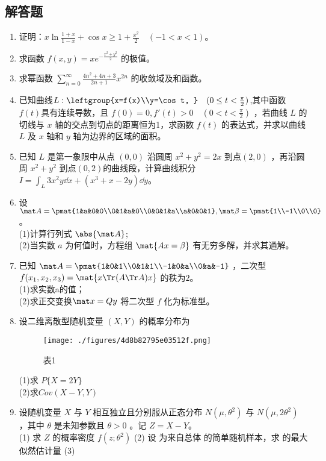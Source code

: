 \subsection{解答题}
\begin{enumerate}
\item 证明：$\displaystyle x\ln \frac{1+x}{1-x}+\cos x\ge 1+\frac{x^2}{2} \quad (-1<x<1)$。
\item  求函数 $\displaystyle f(x,y)=xe^{-\frac{x^2+y^2}{2}}$  的极值。
\item  求幂函数 $\displaystyle \sum_{n=0}^\infty \frac{4n^2+4n+3}{2n+1}x^{2n}$ 的收敛域及和函数。
\item 已知曲线$L:\leftgroup{x=f(x)\\y=\cos t, }\quad (0 \le t<\frac{\pi}{2} )$,其中函数 $f(t)$具有连续导数，且 $f(0)=0,f'(t)>0 \quad (0<t<\frac{\pi}{2})$  ，若曲线 $L$ 的切线与 $x$ 轴的交点到切点的距离恒为1，求函数 $f(t)$ 的表达式，并求以曲线 $L$  及 $x$ 轴和 $y$ 轴为边界的区域的面积。
\item  已知 $L$ 是第一象限中从点 $(0,0)$ 沿圆周 $x^2+y^2=2x$ 到点$ (2,0)$ ，再沿圆周 $x^2+y^2$ 到点$ (0,2)$的曲线段，计算曲线积分  $\displaystyle I=\int_L 3x^2y\dd{x+(x^3+x-2y)}\dd{y}$。
\item 设 $\mat A=\pmat{1&a&0&0\\0&1&a&0\\0&0&1&a\\a&0&0&1},\mat \beta =\pmat{1\\-1\\0\\0}$。\\
(1)计算行列式 $\abs{\mat A }$;\\
(2)当实数 $a$ 为何值时，方程组 $\mat{ Ax=\beta}$ 有无穷多解，并求其通解。
\item  已知 $\mat A=\pmat{1&0&1\\0&1&1\\-1&0&a\\0&a&-1}$  ，二次型  $f(x_1,x_2,x_3)=\mat{x \Tr(A \Tr A)x}$ 的秩为$2$。\\
(1)求实数a的值；\\
(2)求正交变换$\mat x=Qy$ 将二次型 $f$ 化为标准型。
\item 设二维离散型随机变量 $(X,Y)$ 的概率分布为
\begin{figure}[ht]
\centering
\texttt{[image: ./figures/4d8b82795e03512f.png]}
\caption{表1} \label{fig_PeeM12_1}
\end{figure}
(1)求 $P\{X=2Y\}$\\
(2)求$Cov (X-Y,Y)$
\item 设随机变量 $X$ 与 $Y$ 相互独立且分别服从正态分布 $N(\mu,\theta^2)$ 与 $N(\mu,2\theta^2)$ ，其中 $\theta$ 是未知参数且 $\theta>0$ 。记 $Z=X-Y$。\\
(1) 求 $Z$ 的概率密度 $f(z;\theta^2)$
(2)  设  为来自总体  的简单随机样本，求  的最大似然估计量 
(3)
\end{enumerate}

